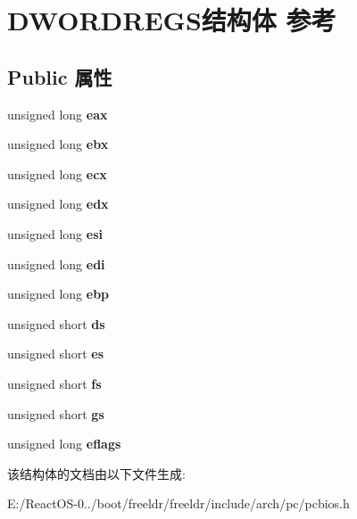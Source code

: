 \hypertarget{struct_d_w_o_r_d_r_e_g_s}{}\section{D\+W\+O\+R\+D\+R\+E\+G\+S结构体 参考}
\label{struct_d_w_o_r_d_r_e_g_s}
\subsection*{Public 属性}
\begin{DoxyCompactItemize}
\item 
\mbox{\label{struct_d_w_o_r_d_r_e_g_s_ae6ac68a48ec1681472a24cdfa51173af}} 
unsigned long {\bfseries eax}
\item 
\mbox{\label{struct_d_w_o_r_d_r_e_g_s_a5ec9421592996d195d76cb3e143382f0}} 
unsigned long {\bfseries ebx}
\item 
\mbox{\label{struct_d_w_o_r_d_r_e_g_s_affdf995c46e396f35c9850e5c311298f}} 
unsigned long {\bfseries ecx}
\item 
\mbox{\label{struct_d_w_o_r_d_r_e_g_s_a98ae51ab47e85fb37d1272fa94fb1160}} 
unsigned long {\bfseries edx}
\item 
\mbox{\label{struct_d_w_o_r_d_r_e_g_s_a351235b60d4968268feed47503f8c1e5}} 
unsigned long {\bfseries esi}
\item 
\mbox{\label{struct_d_w_o_r_d_r_e_g_s_af83735c2f191ded769e1b6eaee42b520}} 
unsigned long {\bfseries edi}
\item 
\mbox{\label{struct_d_w_o_r_d_r_e_g_s_a89ed458d0e293c72b138c557af4b394c}} 
unsigned long {\bfseries ebp}
\item 
\mbox{\label{struct_d_w_o_r_d_r_e_g_s_af23bda29370c8f6033c98737a9ce3e5b}} 
unsigned short {\bfseries ds}
\item 
\mbox{\label{struct_d_w_o_r_d_r_e_g_s_a17de2111c4af080fac52e6f331fee7e2}} 
unsigned short {\bfseries es}
\item 
\mbox{\label{struct_d_w_o_r_d_r_e_g_s_a6acd8351fd2f241abc926e12f16c02f1}} 
unsigned short {\bfseries fs}
\item 
\mbox{\label{struct_d_w_o_r_d_r_e_g_s_a1cb27b1bfba97e0591cde76a3fb7fd57}} 
unsigned short {\bfseries gs}
\item 
\mbox{\label{struct_d_w_o_r_d_r_e_g_s_a6827366c449be1d1473f3b1400e62fdd}} 
unsigned long {\bfseries eflags}
\end{DoxyCompactItemize}


该结构体的文档由以下文件生成\+:\begin{DoxyCompactItemize}
\item 
E\+:/\+React\+O\+S-\/0../boot/freeldr/freeldr/include/arch/pc/pcbios.\+h\end{DoxyCompactItemize}
